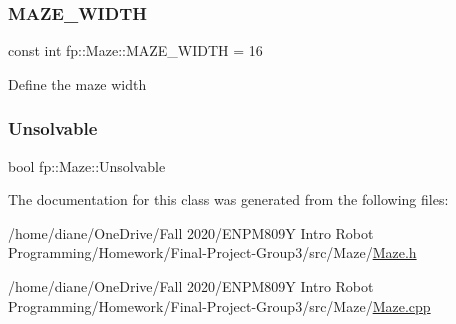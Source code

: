 \subsubsection{\texorpdfstring{M\+A\+Z\+E\+\_\+\+W\+I\+D\+TH}{MAZE\_WIDTH}}
{\footnotesize\ttfamily const int fp\+::\+Maze\+::\+M\+A\+Z\+E\+\_\+\+W\+I\+D\+TH = 16\hspace{0.3cm}{\ttfamily [static]}}

Define the maze width \mbox{\label{classfp_1_1_maze_abdf504125bc0cd3ea18ba17b0887a5a2}} 
\subsubsection{\texorpdfstring{Unsolvable}{Unsolvable}}
{\footnotesize\ttfamily bool fp\+::\+Maze\+::\+Unsolvable}



The documentation for this class was generated from the following files\+:\begin{DoxyCompactItemize}
\item 
/home/diane/\+One\+Drive/\+Fall 2020/\+E\+N\+P\+M809\+Y Intro Robot Programming/\+Homework/\+Final-\/\+Project-\/\+Group3/src/\+Maze/\hyperlink{_maze_8h}{Maze.\+h}\item 
/home/diane/\+One\+Drive/\+Fall 2020/\+E\+N\+P\+M809\+Y Intro Robot Programming/\+Homework/\+Final-\/\+Project-\/\+Group3/src/\+Maze/\hyperlink{_maze_8cpp}{Maze.\+cpp}\end{DoxyCompactItemize}
